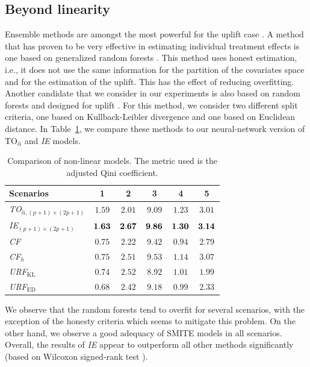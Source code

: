 \documentclass{article}
\begin{document}
\subsection{Beyond linearity}


Ensemble methods are amongst the most powerful for the uplift case \citep{soltys2015ensemble}. A method that has proven to be very effective in estimating individual treatment effects is one based on generalized random forests \citep{athey2019generalized}. This method uses honest estimation, i.e., it does not use the same information for the partition of the covariates space and for the estimation of the uplift. This has the effect of reducing overfitting. Another candidate that we consider in our experiments is also based on random forests and designed for uplift \citep{jaskowski2012uplift}. For this method, we consider two different split criteria, one based on Kullback-Leibler divergence and one based on Euclidean distance. In Table~\ref{tab:beyond_linearity_results}, we compare these methods to our neural-network version of TO$_{\hat{\alpha}}$ and {\it IE} models.

\begin{table}[!ht]
    \centering
    \caption{Comparison of non-linear models. The metric used is the adjusted Qini coefficient.}
    \label{tab:beyond_linearity_results}
    \begin{tabular}{l|ccccc}
        Scenarios & 1 & 2 & 3 & 4 & 5\\
        \hline
        {\it TO$_{\hat{\alpha},(p+1)\times(2p+1)}$} & $1.59$ & $2.01$ & $9.09$ &  $1.23$ & $3.01$ \\
        {\it IE$_{(p+1)\times(2p+1)}$} & $\bf 1.63$ & $\bf 2.67$  & $\bf 9.86$ & $\bf 1.30$ & $\bf 3.14$\\
        {\it CF} & $0.75$ & $2.22$ & $9.42$ & $0.94$ & $2.79$ \\
        {\it CF$_{h}$} & $0.75$  & $2.51$ & $9.53$ & $1.14$ & $3.07$\\
        {\it URF$_{\mathrm{KL}}$} & $0.74$ & $2.52$ & $8.92$ & $1.01$& $1.99$ \\
        {\it URF$_{\mathrm{ED}}$} & $0.68$ & $2.42$ & $9.18$ & $0.99$ & $2.33$ \\
        \hline
    \end{tabular}
   
\end{table}



We observe that the random forests tend to overfit for several scenarios, with the exception of the honesty criteria which seems to mitigate this problem. On the other hand, we observe a good adequacy of SMITE models in all scenarios. Overall, the results of {\it IE} appear to outperform all other methods significantly (based on  Wilcoxon signed-rank test \citep{wilcoxon1992individual}).
\end{document}
